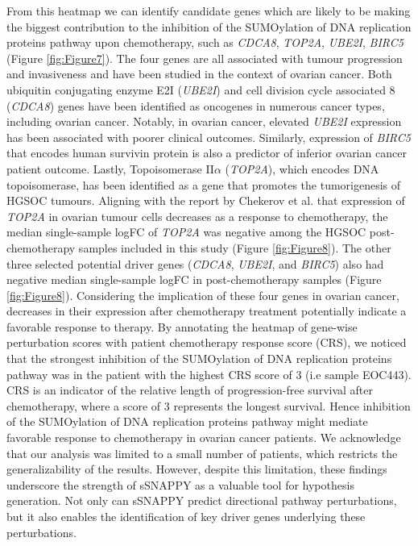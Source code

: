 \documentclass[9pt,a4paper,]{extarticle}
\begin{document}
From this heatmap we can identify candidate genes which are likely to be making the biggest contribution to the inhibition of the SUMOylation of DNA replication proteins pathway upon chemotherapy,
such as \emph{CDCA8}, \emph{TOP2A}, \emph{UBE2I}, \emph{BIRC5} (Figure \ref{fig:Figure7}).
The four genes are all associated with tumour progression and invasiveness and have been studied in the context of ovarian cancer.
Both ubiquitin conjugating enzyme E2I (\emph{UBE2I}) and cell division cycle associated 8 (\emph{CDCA8}) genes have been identified as oncogenes in numerous cancer types, including ovarian cancer\citep{Dong2013, qi2021}.
Notably, in ovarian cancer, elevated \emph{UBE2I} expression has been associated with poorer clinical outcomes\citep{Zou2020}.
Similarly, expression of \emph{BIRC5} that encodes human survivin protein is also a predictor of inferior ovarian cancer patient outcome\citep{Gasowska-Bajger2021}.
Lastly, Topoisomerase II\(\alpha\) (\emph{TOP2A}), which encodes DNA topoisomerase, has been identified as a gene that promotes the tumorigenesis of HGSOC tumours\citep{Gao2020}.
Aligning with the report by Chekerov et al.\citep{Chekerov2006} that expression of \emph{TOP2A} in ovarian tumour cells decreases as a response to chemotherapy\citep{Chekerov2006}, the median single-sample logFC of \emph{TOP2A} was negative among the HGSOC post-chemotherapy samples included in this study (Figure \ref{fig:Figure8}).
The other three selected potential driver genes (\emph{CDCA8}, \emph{UBE2I}, and \emph{BIRC5}) also had negative median single-sample logFC in post-chemotherapy samples (Figure \ref{fig:Figure8}).
Considering the implication of these four genes in ovarian cancer, decreases in their expression after chemotherapy treatment potentially indicate a favorable response to therapy.
By annotating the heatmap of gene-wise perturbation scores with patient chemotherapy response score (CRS), we noticed that the strongest inhibition of the SUMOylation of DNA replication proteins pathway was in the patient with the highest CRS score of 3 (i.e sample EOC443).
CRS is an indicator of the relative length of progression-free survival after chemotherapy, where a score of 3 represents the longest survival.
Hence inhibition of the SUMOylation of DNA replication proteins pathway might mediate favorable response to chemotherapy in ovarian cancer patients.
We acknowledge that our analysis was limited to a small number of patients, which restricts the generalizability of the results.
However, despite this limitation, these findings underscore the strength of sSNAPPY as a valuable tool for hypothesis generation.
Not only can sSNAPPY predict directional pathway perturbations, but it also enables the identification of key driver genes underlying these perturbations.
\end{document}
